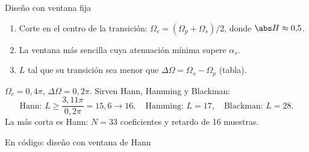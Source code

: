 \documentclass[aspectratio=169,11pt]{beamer}
\begin{document}
\begin{frame}{Diseño con ventana fija}
  \begin{importante}[Receta]
    \begin{enumerate}
      \item Corte en el centro de la transición: $\Omega_c=(\Omega_p+\Omega_s)/2$, donde $\abs H\approx0{,}5$.
      \item La ventana más sencilla cuya atenuación mínima supere $\alpha_s$.
      \item $L$ tal que su transición sea menor que $\Delta\Omega=\Omega_s-\Omega_p$ (tabla).
    \end{enumerate}
  \end{importante}
  \begin{ejemplo}[$\Omega_p=0{,}3\pi$, $\Omega_s=0{,}5\pi$, $\alpha_s=40$\,dB]
    $\Omega_c=0{,}4\pi$, $\Delta\Omega=0{,}2\pi$. Sirven Hann, Hamming y Blackman:
    \[
      \text{Hann: }L\ge\frac{3{,}11\pi}{0{,}2\pi}=15{,}6\to16,\quad \text{Hamming: }L=17,\quad\text{Blackman: }L=28.
    \]
    La más corta es Hann: $N=33$ coeficientes y retardo de 16 muestras.
  \end{ejemplo}
\end{frame}

\begin{frame}{En código: diseño con ventana de Hann}
\end{frame}
\end{document}
